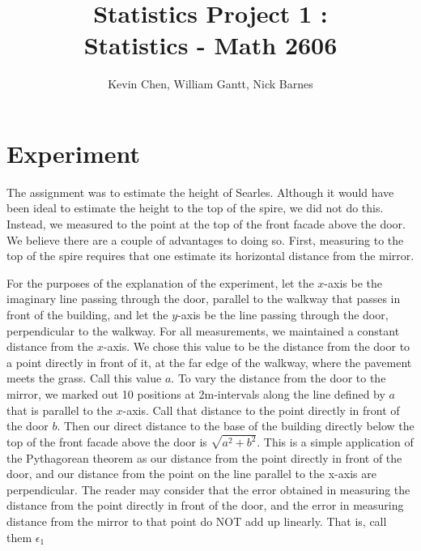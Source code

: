 \documentclass[11pt]{article}
\title{Statistics Project 1 : \\ Statistics - Math 2606}
\author{Kevin Chen, William Gantt, Nick Barnes}
\date{}
\begin{document}
\maketitle
\section{Experiment}
The assignment was to estimate the height of Searles. Although it would have been ideal to estimate the height to the top of the spire, we did not do this. Instead, we measured to the point at the top of the front facade above the door. We believe there are a couple of advantages to doing so. First, measuring to the top of the spire requires that one estimate its horizontal distance from the mirror. 

For the purposes of the explanation of the experiment, let the $x$-axis be the imaginary line passing through the door, parallel to the walkway that passes in front of the building, and let the $y$-axis be the line passing through the door, perpendicular to the walkway. For all measurements, we maintained a constant distance from the $x$-axis. We chose this value to be the distance from the door to a point directly in front of it, at the far edge of the walkway, where the pavement meets the grass. Call this value $a$. To vary the distance from the door to the mirror, we marked out 10 positions at 2m-intervals along the line defined by $a$ that is parallel to the $x$-axis. Call that distance to the point directly in front of the door $b$. Then our direct distance to the base of the building directly below the top of the front facade above the door is $\sqrt{a^2+b^2}$. This is a simple application of the Pythagorean theorem as our distance from the point directly in front of the door, and our distance from the point on the line parallel to the x-axis are perpendicular. 
The reader may consider that the error obtained in measuring the distance from the point directly in front of the door, and the error in measuring distance from the mirror to that point do NOT add up linearly. That is, call them $\epsilon_1$
\end{document}
